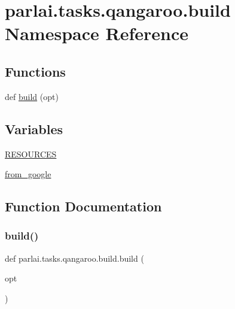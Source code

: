 \hypertarget{namespaceparlai_1_1tasks_1_1qangaroo_1_1build}{}\section{parlai.\+tasks.\+qangaroo.\+build Namespace Reference}
\label{namespaceparlai_1_1tasks_1_1qangaroo_1_1build}
\subsection*{Functions}
\begin{DoxyCompactItemize}
\item 
def \hyperlink{namespaceparlai_1_1tasks_1_1qangaroo_1_1build_a589f782a002790f9ff6a72dae2233368}{build} (opt)
\end{DoxyCompactItemize}
\subsection*{Variables}
\begin{DoxyCompactItemize}
\item 
\hyperlink{namespaceparlai_1_1tasks_1_1qangaroo_1_1build_a9df9ad31290da5c6e60e353e6e69afa1}{R\+E\+S\+O\+U\+R\+C\+ES}
\item 
\hyperlink{namespaceparlai_1_1tasks_1_1qangaroo_1_1build_a391781ee6878917af2e1777861b763fb}{from\+\_\+google}
\end{DoxyCompactItemize}


\subsection{Function Documentation}
\mbox{\label{namespaceparlai_1_1tasks_1_1qangaroo_1_1build_a589f782a002790f9ff6a72dae2233368}} 
\subsubsection{\texorpdfstring{build()}{build()}}
{\footnotesize\ttfamily def parlai.\+tasks.\+qangaroo.\+build.\+build (\begin{DoxyParamCaption}\item[{}]{opt }\end{DoxyParamCaption})}



